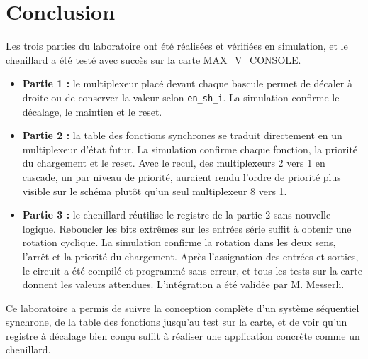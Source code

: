 \section{Conclusion}

Les trois parties du laboratoire ont été réalisées et vérifiées en simulation, et le chenillard a été testé avec succès sur la carte MAX\_V\_CONSOLE.

\begin{itemize}
	\item \textbf{Partie 1 :} le multiplexeur placé devant chaque bascule permet de décaler à droite ou de conserver la valeur selon \texttt{en\_sh\_i}. La simulation confirme le décalage, le maintien et le reset.
	\item \textbf{Partie 2 :} la table des fonctions synchrones se traduit directement en un multiplexeur d'état futur. La simulation confirme chaque fonction, la priorité du chargement et le reset. Avec le recul, des multiplexeurs 2 vers 1 en cascade, un par niveau de priorité, auraient rendu l'ordre de priorité plus visible sur le schéma plutôt qu'un seul multiplexeur 8 vers 1.
	\item \textbf{Partie 3 :} le chenillard réutilise le registre de la partie 2 sans nouvelle logique. Reboucler les bits extrêmes sur les entrées série suffit à obtenir une rotation cyclique. La simulation confirme la rotation dans les deux sens, l'arrêt et la priorité du chargement. Après l'assignation des entrées et sorties, le circuit a été compilé et programmé sans erreur, et tous les tests sur la carte donnent les valeurs attendues. L'intégration a été validée par M. Messerli.
\end{itemize}

Ce laboratoire a permis de suivre la conception complète d'un système séquentiel synchrone, de la table des fonctions jusqu'au test sur la carte, et de voir qu'un registre à décalage bien conçu suffit à réaliser une application concrète comme un chenillard.
